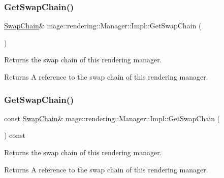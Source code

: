 \subsubsection{\texorpdfstring{Get\+Swap\+Chain()}{GetSwapChain()}\hspace{0.1cm}{\footnotesize\ttfamily [1/2]}}
{\footnotesize\ttfamily \hyperlink{classmage_1_1rendering_1_1_swap_chain}{Swap\+Chain}\& mage\+::rendering\+::\+Manager\+::\+Impl\+::\+Get\+Swap\+Chain (\begin{DoxyParamCaption}{ }\end{DoxyParamCaption})\hspace{0.3cm}{\ttfamily [noexcept]}}

Returns the swap chain of this rendering manager.

\begin{DoxyReturn}{Returns}
A reference to the swap chain of this rendering manager. 
\end{DoxyReturn}
\hypertarget{classmage_1_1rendering_1_1_manager_1_1_impl_a7595cf95fc4af88ae359d77fce0681b3}{}\label{classmage_1_1rendering_1_1_manager_1_1_impl_a7595cf95fc4af88ae359d77fce0681b3} 
\subsubsection{\texorpdfstring{Get\+Swap\+Chain()}{GetSwapChain()}\hspace{0.1cm}{\footnotesize\ttfamily [2/2]}}
{\footnotesize\ttfamily const \hyperlink{classmage_1_1rendering_1_1_swap_chain}{Swap\+Chain}\& mage\+::rendering\+::\+Manager\+::\+Impl\+::\+Get\+Swap\+Chain (\begin{DoxyParamCaption}{ }\end{DoxyParamCaption}) const\hspace{0.3cm}{\ttfamily [noexcept]}}

Returns the swap chain of this rendering manager.

\begin{DoxyReturn}{Returns}
A reference to the swap chain of this rendering manager. 
\end{DoxyReturn}
\hypertarget{classmage_1_1rendering_1_1_manager_1_1_impl_a01dbb540b262170ae3518c9a72945046}{}\label{classmage_1_1rendering_1_1_manager_1_1_impl_a01dbb540b262170ae3518c9a72945046} 
